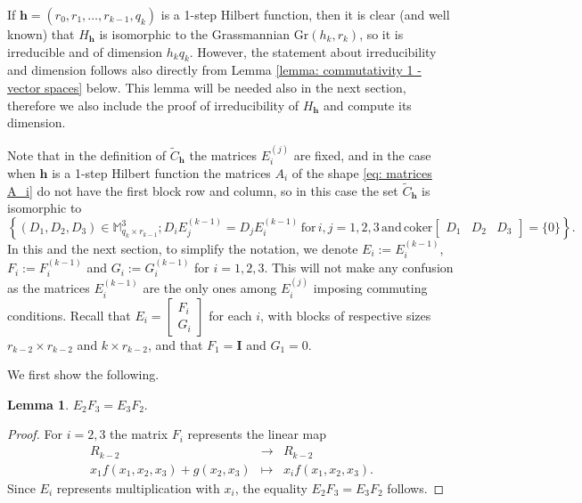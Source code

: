 \documentclass[11pt]{amsart}
\newtheorem{lemma}[thm]{Lemma}
\theoremstyle{definition}
\newcommand{\h}{\mathbf{h}}
\newcommand{\tC}{\widetilde{C}}
\newcommand{\II}{\mathbf{I}}
\begin{document}
If $\h=(r_0,r_1,\ldots ,r_{k-1},q_k)$ is a 1-step Hilbert function, then it is clear (and well known) that $H_\h$ is isomorphic to the Grassmannian $\mathrm{Gr}(h_k,r_k)$, so it is irreducible and of dimension $h_kq_k$. However, the statement about irreducibility and dimension follows also directly from Lemma \ref{lemma: commutativity 1 - vector spaces} below. This lemma will be needed also in the next section, therefore we also include the proof of irreducibility of $H_\h$ and compute its dimension.

Note that in the definition of $\tC_\h$ the matrices $E_i^{(j)}$ are fixed, and in the case when $\h$ is a 1-step Hilbert function the matrices $A_i$ of the shape \eqref{eq: matrices A_i} do not have the first block row and column, so in this case the set $\tC_\h$ is isomorphic to
\begin{equation}\label{eq: D_iE_j=D_jE_i}
\left\{(D_1,D_2,D_3)\in \mathbb{M}_{q_k\times r_{k-1}}^3;D_iE_j^{(k-1)}=D_jE_i^{(k-1)}\, \mathrm{for}\, i,j=1,2,3\, \mathrm{and}\, \mathrm{coker}\begin{bmatrix} D_1 & D_2 & D_3 \end{bmatrix} =\{0\}\right\}.
\end{equation}
In this and the next section, to simplify the notation, we denote $E_i:=E_i^{(k-1)}$, $F_i:=F_i^{(k-1)}$ and $G_i:=G_i^{(k-1)}$ for $i=1,2,3$. This will not make any confusion as the matrices $E_i^{(k-1)}$ are the only ones among $E_i^{(j)}$ imposing commuting conditions. Recall that $E_i=\begin{bmatrix} F_i \\ G_i \end{bmatrix}$ for each $i$, with blocks of respective sizes $r_{k-2}\times r_{k-2}$ and $k\times r_{k-2}$, and that $F_1=\II$ and $G_1=0$.

We first show the following.

\begin{lemma}\label{lemma: commutativity of E_i}
$E_2F_3=E_3F_2.$
\end{lemma}

\begin{proof}
For $i=2,3$ the matrix $F_i$ represents the linear map
\begin{eqnarray*}
R_{k-2}&\to&R_{k-2}\\
x_1f(x_1,x_2,x_3)+g(x_2,x_3)&\mapsto&x_if(x_1,x_2,x_3).
\end{eqnarray*}
Since $E_i$ represents multiplication with $x_i$, the equality $E_2F_3=E_3F_2$ follows.
\end{proof}
\end{document}
